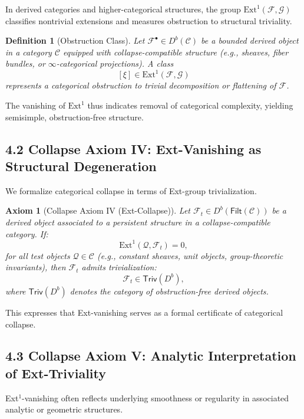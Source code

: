 \documentclass[11pt]{article}
\newtheorem{definition}[theorem]{Definition}
\newtheorem{axiom}{Axiom}[section]
\begin{document}
In derived categories and higher-categorical structures, the group \( \mathrm{Ext}^1(\mathcal{F}, \mathcal{G}) \) classifies nontrivial extensions and measures obstruction to structural triviality.

\begin{definition}[Obstruction Class]
Let \( \mathcal{F}^\bullet \in D^b(\mathcal{C}) \) be a bounded derived object in a category \( \mathcal{C} \) equipped with collapse-compatible structure (e.g., sheaves, fiber bundles, or \(\infty\)-categorical projections).  
A class
\[
[\xi] \in \mathrm{Ext}^1(\mathcal{F}, \mathcal{G})
\]
represents a categorical obstruction to trivial decomposition or flattening of \( \mathcal{F} \).
\end{definition}

The vanishing of \( \mathrm{Ext}^1 \) thus indicates removal of categorical complexity, yielding semisimple, obstruction-free structure.

\subsection*{4.2 Collapse Axiom IV: Ext-Vanishing as Structural Degeneration}

We formalize categorical collapse in terms of Ext-group trivialization.

\begin{axiom}[Collapse Axiom IV (Ext-Collapse)]
Let \( \mathcal{F}_t \in D^b(\mathsf{Filt}(\mathcal{C})) \) be a derived object associated to a persistent structure in a collapse-compatible category.  
If:
\[
\mathrm{Ext}^1(\mathcal{Q}, \mathcal{F}_t) = 0,
\]
for all test objects \( \mathcal{Q} \in \mathcal{C} \) (e.g., constant sheaves, unit objects, group-theoretic invariants),  
then \( \mathcal{F}_t \) admits trivialization:
\[
\mathcal{F}_t \in \mathsf{Triv}(D^b),
\]
where \( \mathsf{Triv}(D^b) \) denotes the category of obstruction-free derived objects.
\end{axiom}

This expresses that Ext-vanishing serves as a formal certificate of categorical collapse.

\subsection*{4.3 Collapse Axiom V: Analytic Interpretation of Ext-Triviality}

Ext$^1$-vanishing often reflects underlying smoothness or regularity in associated analytic or geometric structures.
\end{document}
